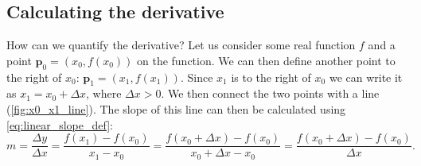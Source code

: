 \subsection{Calculating the derivative}
\label{sub:calculating the derivative}
How can we quantify the derivative? Let us consider some real function $f$ and a point $\bm{p}_{0} = \left(x_{0},f\left(x_{0}\right)\right)$ on the function. We can then define another point to the right of $x_{0}$: $\bm{p}_{1}=\left(x_{1},f\left(x_{1}\right)\right)$. Since $x_{1}$ is to the right of $x_{0}$ we can write it as $x_{1}=x_{0}+\Delta x$, where $\Delta x>0$. We then connect the two points with a line (\autoref{fig:x0_x1_line}). The slope of this line can then be calculated using \autoref{eq:linear_slope_def}:
\begin{equation}
  m = \frac{\Delta y}{\Delta x} = \frac{f\left(x_{1}\right)-f\left(x_{0}\right)}{x_{1}-x_{0}} = \frac{f\left(x_{0}+\Delta x\right)-f\left(x_{0}\right)}{x_{0}+\Delta x - x_{0}} = \frac{f\left(x_{0}+\Delta x\right)-f\left(x_{0}\right)}{\Delta x}.
  \label{eq:derivative_slope_def}
\end{equation}

